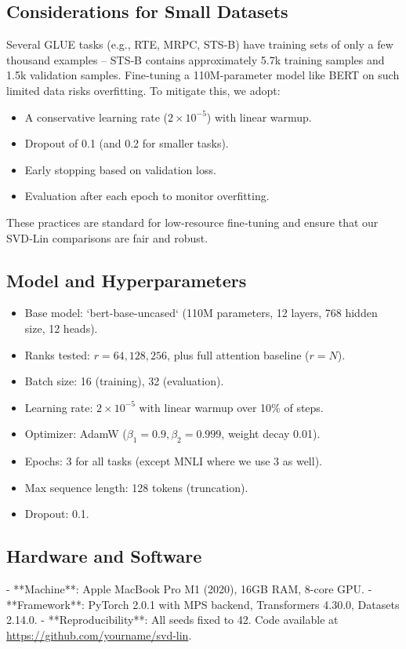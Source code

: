 \documentclass[twocolumn]{article}
\begin{document}
\subsection{Considerations for Small Datasets}
Several GLUE tasks (e.g., RTE, MRPC, STS‑B) have training sets of only a few thousand examples – STS‑B contains approximately 5.7k training samples and 1.5k validation samples. Fine‑tuning a 110M‑parameter model like BERT on such limited data risks overfitting. To mitigate this, we adopt:
\begin{itemize}
    \item A conservative learning rate ($2\times10^{-5}$) with linear warmup.
    \item Dropout of 0.1 (and 0.2 for smaller tasks).
    \item Early stopping based on validation loss.
    \item Evaluation after each epoch to monitor overfitting.
\end{itemize}
These practices are standard for low‑resource fine‑tuning and ensure that our SVD‑Lin comparisons are fair and robust.

\subsection{Model and Hyperparameters}
\begin{itemize}
    \item Base model: `bert-base-uncased` (110M parameters, 12 layers, 768 hidden size, 12 heads).
    \item Ranks tested: $r = 64, 128, 256$, plus full attention baseline ($r = N$).
    \item Batch size: 16 (training), 32 (evaluation).
    \item Learning rate: $2 \times 10^{-5}$ with linear warmup over 10\% of steps.
    \item Optimizer: AdamW ($\beta_1=0.9, \beta_2=0.999$, weight decay 0.01).
    \item Epochs: 3 for all tasks (except MNLI where we use 3 as well).
    \item Max sequence length: 128 tokens (truncation).
    \item Dropout: 0.1.
\end{itemize}

\subsection{Hardware and Software}
- **Machine**: Apple MacBook Pro M1 (2020), 16GB RAM, 8-core GPU.
- **Framework**: PyTorch 2.0.1 with MPS backend, Transformers 4.30.0, Datasets 2.14.0.
- **Reproducibility**: All seeds fixed to 42. Code available at \url{https://github.com/yourname/svd-lin}.
\end{document}
